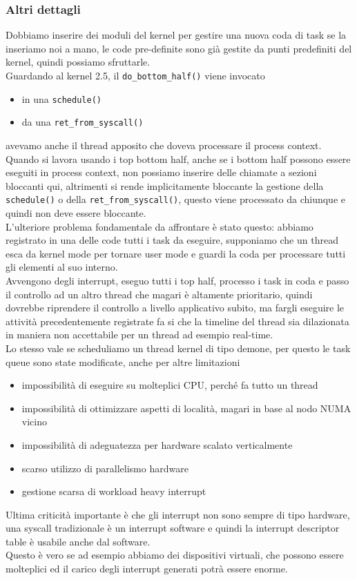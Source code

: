 \documentclass[12pt, oneside]{extbook}
\begin{document}
\subsubsection{Altri dettagli}
Dobbiamo inserire dei moduli del kernel per gestire una nuova coda di task se la inseriamo noi a mano, le code pre-definite sono già gestite da punti predefiniti del kernel, quindi possiamo sfruttarle.\\Guardando al kernel 2.5, il \texttt{do\_bottom\_half()} viene invocato
\begin{itemize}
\item in una \texttt{schedule()}
\item da una \texttt{ret\_from\_syscall()}
\end{itemize}
avevamo anche il thread apposito che doveva processare il process context.\\Quando si lavora usando i top bottom half, anche se i bottom half possono essere eseguiti in process context, non possiamo inserire delle chiamate a sezioni bloccanti qui, altrimenti si rende implicitamente bloccante la gestione della \texttt{schedule()} o della \texttt{ret\_from\_syscall()}, questo viene processato da chiunque e quindi non deve essere bloccante.\\L'ulteriore problema fondamentale da affrontare è stato questo: abbiamo registrato in una delle code tutti i task da eseguire, supponiamo che un thread esca da kernel mode per tornare user mode e guardi la coda per processare tutti gli elementi al suo interno.\\Avvengono degli interrupt, eseguo tutti i top half, processo i task in coda e passo il controllo ad un altro thread che magari è altamente prioritario, quindi dovrebbe riprendere il controllo a livello applicativo subito, ma fargli eseguire le attività precedentemente registrate fa si che la timeline del thread sia dilazionata in maniera non accettabile per un thread ad esempio real-time.\\Lo stesso vale se scheduliamo un thread kernel di tipo demone, per questo le task queue sono state modificate, anche per altre limitazioni
\begin{itemize}
\item impossibilità di eseguire su molteplici CPU, perché fa tutto un thread
\item impossibilità di ottimizzare aspetti di località, magari in base al nodo NUMA vicino
\item impossibilità di adeguatezza per hardware scalato verticalmente
\item scarso utilizzo di parallelismo hardware
\item gestione scarsa di workload heavy interrupt
\end{itemize}
Ultima criticità importante è che gli interrupt non sono sempre di tipo hardware, una syscall tradizionale è un interrupt software e quindi la interrupt descriptor table è usabile anche dal software.\\Questo è vero se ad esempio abbiamo dei dispositivi virtuali, che possono essere molteplici ed il carico degli interrupt generati potrà essere enorme.
\end{document}
